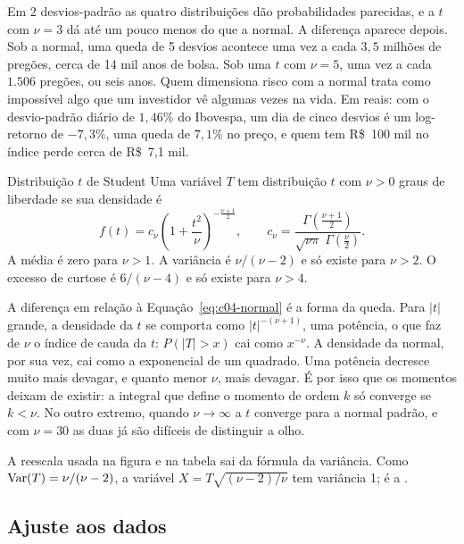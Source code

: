 Em 2 desvios-padrão as quatro distribuições dão probabilidades parecidas, e a $t$ com $\nu = 3$ dá até um pouco menos do que a normal. A diferença aparece depois. Sob a normal, uma queda de 5 desvios acontece uma vez a cada $3,5$ milhões de pregões, cerca de 14 mil anos de bolsa. Sob uma $t$ com $\nu = 5$, uma vez a cada $1.506$ pregões, ou seis anos. Quem dimensiona risco com a normal trata como impossível algo que um investidor vê algumas vezes na vida. Em reais: com o desvio-padrão diário de $1,46\%$ do Ibovespa, um dia de cinco desvios é um log-retorno de $-7,3\%$, uma queda de $7,1\%$ no preço, e quem tem R\$~100 mil no índice perde cerca de R\$~7,1 mil.

\begin{definicao}{Distribuição $t$ de Student}
Uma variável $T$ tem distribuição $t$ com $\nu > 0$ graus de liberdade se sua densidade é
\begin{equation}
  f(t) = c_\nu \left(1 + \frac{t^2}{\nu}\right)^{-\frac{\nu+1}{2}} , \qquad
  c_\nu = \frac{\Gamma\!\left(\frac{\nu+1}{2}\right)}{\sqrt{\nu\pi}\;\Gamma\!\left(\frac{\nu}{2}\right)} .
  \label{eq:c04-t}
\end{equation}
A média é zero para $\nu > 1$. A variância é $\nu/(\nu-2)$ e só existe para $\nu > 2$. O excesso de curtose é $6/(\nu-4)$ e só existe para $\nu > 4$.
\end{definicao}

A diferença em relação à Equação~\eqref{eq:c04-normal} é a forma da queda. Para $|t|$ grande, a densidade da $t$ se comporta como $|t|^{-(\nu+1)}$, uma potência, o que faz de $\nu$ o índice de cauda da $t$: $P(|T| > x)$ cai como $x^{-\nu}$. A densidade da normal, por sua vez, cai como a exponencial de um quadrado. Uma potência decresce muito mais devagar, e quanto menor $\nu$, mais devagar. É por isso que os momentos deixam de existir: a integral que define o momento de ordem $k$ só converge se $k < \nu$. No outro extremo, quando $\nu \to \infty$ a $t$ converge para a normal padrão, e com $\nu = 30$ as duas já são difíceis de distinguir a olho.

A reescala usada na figura e na tabela sai da fórmula da variância. Como $\operatorname{Var}(T) = \nu/(\nu-2)$, a variável $X = T\sqrt{(\nu-2)/\nu}$ tem variância 1; é a .

\subsection{Ajuste aos dados}

